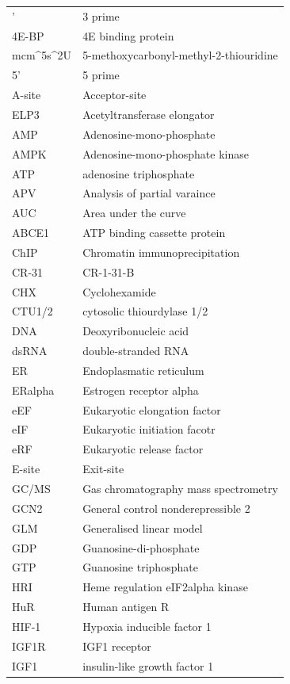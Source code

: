 \documentclass[
  12pt,
  openany]{book}
\begin{document}
\begin{longtable}{ll}
\endfoot
\bottomrule
\endlastfoot
3' & 3 prime\\
4E-BP & 4E binding protein\\
mcm\textasciicircum{}5s\textasciicircum{}2U & 5-methoxycarbonyl-methyl-2-thiouridine\\
5' & 5 prime\\
A-site & Acceptor-site\\
\addlinespace
ELP3 & Acetyltransferase elongator\\
AMP & Adenosine-mono-phosphate\\
AMPK & Adenosine-mono-phosphate
kinase\\
ATP & adenosine triphosphate\\
APV & Analysis of partial varaince\\
\addlinespace
AUC & Area under the curve\\
ABCE1 & ATP binding cassette protein\\
ChIP & Chromatin immunoprecipitation\\
CR-31 & CR-1-31-B\\
CHX & Cyclohexamide\\
\addlinespace
CTU1/2 & cytosolic thiourdylase 1/2\\
DNA & Deoxyribonucleic acid\\
dsRNA & double-stranded RNA\\
ER & Endoplasmatic reticulum\\
ERalpha & Estrogen receptor alpha\\
\addlinespace
eEF & Eukaryotic elongation factor\\
eIF & Eukaryotic initiation facotr\\
eRF & Eukaryotic release factor\\
E-site & Exit-site\\
GC/MS & Gas chromatography
mass spectrometry\\
\addlinespace
GCN2 & General control nonderepressible 2\\
GLM & Generalised linear model\\
GDP & Guanosine-di-phosphate\\
GTP & Guanosine triphosphate\\
HRI & Heme regulation eIF2alpha kinase\\
\addlinespace
HuR & Human antigen R\\
HIF-1 & Hypoxia inducible factor 1\\
IGF1R & IGF1 receptor\\
IGF1 & insulin-like growth factor 1\\

\end{longtable}
\end{document}
